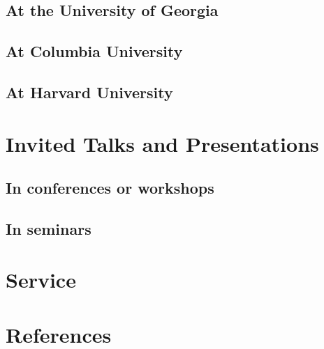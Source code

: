 \documentclass[11pt]{moderncv}
\begin{document}
\subsection{At the University of Georgia}


      
\subsection{At Columbia University}



\subsection{At Harvard University}



\section{Invited Talks and Presentations}

\subsection{In conferences or workshops}



\subsection{In seminars}



\section{Service}

 
            
\section{References}
\end{document}
